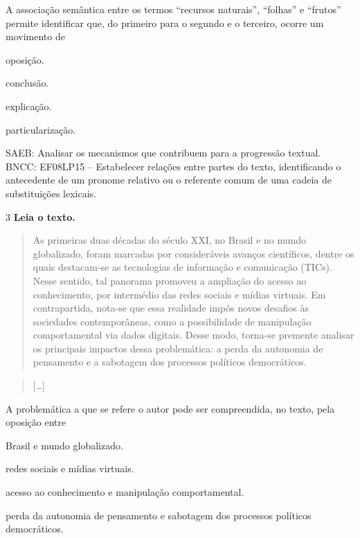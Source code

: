 A associação semântica entre os termos ``recursos naturais'', ``folhas''
e ``frutos'' permite identificar que, do primeiro para o segundo e o
terceiro, ocorre um movimento de

\begin{escolha}
\item oposição.

\item conclusão.

\item explicação.

\item particularização.
\end{escolha}

SAEB: Analisar os mecanismos que contribuem para a progressão textual.
BNCC: EF08LP15 -- Estabelecer relações entre partes do texto,
identificando o antecedente de um pronome relativo ou o referente comum
de uma cadeia de substituições lexicais.

\num{3} \textbf{Leia o texto.}

\begin{quote}
As primeiras duas décadas do século XXI, no Brasil e no mundo
globalizado, foram marcadas por consideráveis avanços científicos,
dentre os quais destacam-se as tecnologias de informação e comunicação
(TICs). Nesse sentido, tal panorama promoveu a ampliação do acesso ao
conhecimento, por intermédio das redes sociais e mídias virtuais. Em
contrapartida, nota-se que essa realidade impôs novos desafios às
sociedades contemporâneas, como a possibilidade de manipulação
comportamental via dados digitais. Desse modo, torna-se premente
analisar os principais impactos dessa problemática: a perda da autonomia
de pensamento e a sabotagem dos processos políticos democráticos.
\end{quote}

\begin{quote}
{[}\ldots{]}
\end{quote}


A problemática a que se refere o autor pode ser compreendida, no texto,
pela oposição entre

\begin{escolha}
\item Brasil e mundo globalizado.

\item redes sociais e mídias virtuais.

\item acesso ao conhecimento e manipulação comportamental.

\item perda da autonomia de pensamento e sabotagem dos processos políticos
democráticos.
\end{escolha}

